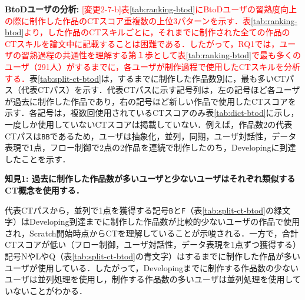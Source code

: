 \documentclass[submit]{ipsj}
\begin{document}
\noindent\textbf{BtoDユーザの分析:} \textcolor{red}{[変更2-7-b]表\ref{tab:ranking-btod}にBtoDユーザの習熟度向上の際に制作した作品のCTスコア重複数の上位3パターンを示す．表\ref{tab:ranking-btod}より，\textcolor{red}{}した作品のCTスキルごとに，それまでに制作された全ての作品のCTスキルを論文中に記載することは困難である．したがって，RQ1では，ユーザの習熟過程の共通性を理解する第１歩として表\ref{tab:ranking-btod}で最も多くのユーザ（291人）が\textcolor{red}{}するまでに，各ユーザが制作過程で使用したCTスキルを分析する．}表\ref{tab:split-ct-btod}は，\textcolor{red}{}するまでに制作した作品数別に，最も多いCTパス（代表CTパス）を示す．代表CTパスに示す記号列は，左の記号ほど各ユーザが過去に制作した作品であり，右の記号ほど新しい作品で使用したCTスコアを示す．各記号は，複数回使用されているCTスコアのみ表\ref{tab:dict-btod}に示し，一度しか使用していないCTスコアは掲載していない．例えば，作品数2の代表CTパスは\texttt{\large{BB}}であるため，ユーザは抽象化，並列，同期，ユーザ対話性，データ表現で1点，フロー制御で2点の2作品を連続で制作したのち，Developingに到達したことを示す．




\noindent\textbf{知見1: 過去に制作した作品数が多いユーザと少ないユーザはそれぞれ類似するCT概念を使用する．}

代表CTパスから，並列で1点を獲得する記号\texttt{\large{B}}と\texttt{\large{F}}（表\ref{tab:split-ct-btod}の緑文字）はDeveloping到達までに制作した作品数が比較的少ないユーザの作品で使用され，Scratch開始時点からCTを理解していることが示唆される．一方で，合計CTスコアが低い（フロー制御，ユーザ対話性，データ表現を1点ずつ獲得する）記号NやLやQ（表\ref{tab:split-ct-btod}の青文字）は\textcolor{red}{}するまでに制作した作品が多いユーザが使用している．したがって，Developingまでに制作する作品数の少ないユーザは並列処理を使用し，制作する作品数の多いユーザは並列処理を使用していないことがわかる．
\end{document}

